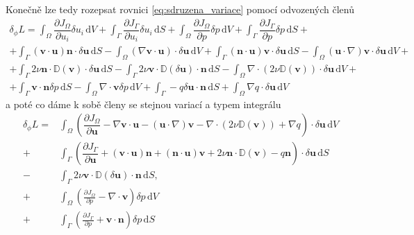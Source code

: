Konečně lze tedy rozepsat rovnici \ref{eq:sdruzena_variace} pomocí odvozených členů
\begin{multline*}
\delta_\phi L = 
\int_{\Omega} \dfrac{\partial J_{\Omega}}{\partial u_i} \delta u_i \, \mathrm{d}V 
+ 
\int_{\Gamma} \dfrac{\partial J_{\Gamma}}{\partial u_i} \delta u_i \, \mathrm{d}S
+
\int_{\Omega} \dfrac{\partial J_{\Omega}}{\partial p} \delta p  \, \mathrm{d}V 
+ 
\int_{\Gamma} \dfrac{\partial J_{\Gamma}}{\partial p} \delta p  \, \mathrm{d}S
+\\+
\int_{\Gamma} 
(\mathbf{v}\cdot \mathbf{u} )\mathbf{n} \cdot \delta\mathbf{u}
\, \mathrm{d}S
-
\int_{\Omega} 
(\nabla \mathbf{v}\cdot \mathbf{u})\cdot\delta \mathbf{u}
\, \mathrm{d}V
+
\int_{\Gamma} 
(\mathbf{n} \cdot \mathbf{u}) \mathbf{v}\cdot \delta \mathbf{u} 
\, \mathrm{d}S
-
\int_{\Omega} 
(\mathbf{u} \cdot \nabla)\mathbf{v}\cdot \delta \mathbf{u}
\, \mathrm{d}V
+\\+
\int_{\Gamma} 
2\nu \mathbf{n} \cdot  \mathbb{D}(\mathbf{v})\cdot \delta \mathbf{u}
\, \mathrm{d}S
- \int_{\Gamma} 
2\nu \mathbf{v} \cdot  \mathbb{D}(\delta \mathbf{u})\cdot \mathbf{n}
\, \mathrm{d}S
-
\int_{\Omega} 
\nabla \cdot \left( 2\nu \mathbb{D}(\mathbf{v}) \right) \cdot \delta \mathbf{u}
\, \mathrm{d}V
+\\+
\int_{\Gamma} 
\mathbf{v}\cdot \mathbf{n} \delta p 
\, \mathrm{d}S
-
\int_{\Omega} 
\nabla \cdot \mathbf{v} \delta p
\, \mathrm{d}V
+
\int_{\Gamma} 
- q \delta \mathbf{u \cdot n}
\, \mathrm{d}S
+
\int_{\Omega} 
\nabla q \cdot \delta \mathbf{u}
\, \mathrm{d}V
\end{multline*}
a poté co dáme k sobě členy se stejnou variací a typem integrálu
\begin{align*}
\delta_\phi L = 
&\int_{\Omega} 
\left(
\dfrac{\partial J_{\Omega}}{\partial \mathbf{u}}
- \nabla \mathbf{v}\cdot \mathbf{u}
- (\mathbf{u} \cdot \nabla)\mathbf{v}
- \nabla \cdot \left( 2\nu \mathbb{D}(\mathbf{v}) \right)
+ \nabla q
\right)
\cdot \delta \mathbf{u}
\, \mathrm{d}V
\\+
&\int_{\Gamma}
\left(
\dfrac{\partial J_{\Gamma}}{\partial \mathbf{u}}
+ (\mathbf{v}\cdot \mathbf{u} )\mathbf{n} 
+ (\mathbf{n} \cdot \mathbf{u}) \mathbf{v}
+ 2\nu \mathbf{n} \cdot  \mathbb{D}(\mathbf{v})
- q \mathbf{n}
\right)
\cdot \delta \mathbf{u}
\, \mathrm{d}S
\\-
&\int_{\Gamma} 
2\nu \mathbf{v} \cdot  \mathbb{D}(\delta \mathbf{u})\cdot \mathbf{n}
\, \mathrm{d}S,
\\+
&\int_{\Omega} 
\left(
\frac{\partial J_\Omega}{\partial p}
- \nabla \cdot \mathbf{v}
\right)
\delta p
\, \mathrm{d}V
\\+
&\int_{\Gamma}
\left(
\frac{\partial J_\Gamma}{\partial p}
+ \mathbf{v} \cdot \mathbf{n}
\right)
 \delta p
\, \mathrm{d}S
\end{align*}
